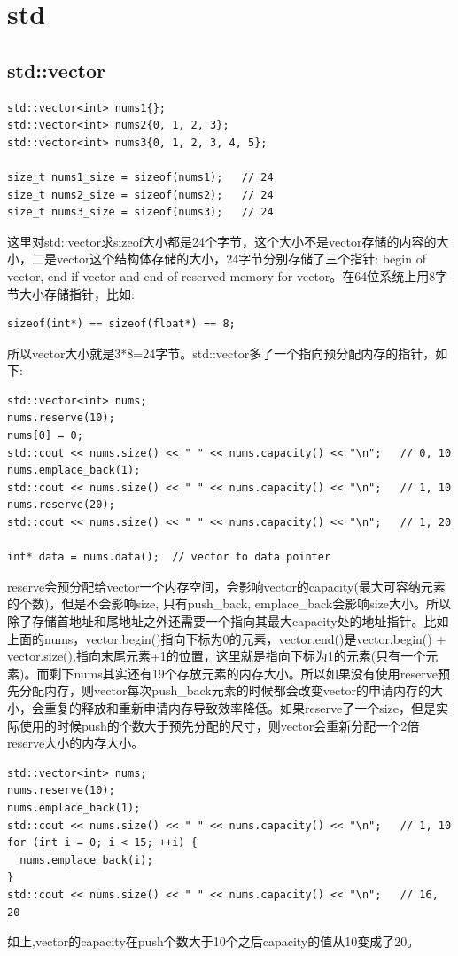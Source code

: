 \documentclass[12pt]{book}
\begin{document}
\section{std}
\subsection{std::vector}
\begin{lstlisting}
std::vector<int> nums1{};
std::vector<int> nums2{0, 1, 2, 3};
std::vector<int> nums3{0, 1, 2, 3, 4, 5};

size_t nums1_size = sizeof(nums1);   // 24
size_t nums2_size = sizeof(nums2);   // 24
size_t nums3_size = sizeof(nums3);   // 24
\end{lstlisting}
这里对std::vector求sizeof大小都是24个字节，这个大小不是vector存储的内容的大小，二是vector这个结构体存储的大小，24字节分别存储了三个指针: begin of vector, end if vector and end of reserved memory for vector。在64位系统上用8字节大小存储指针，比如:
\begin{lstlisting}
sizeof(int*) == sizeof(float*) == 8;
\end{lstlisting}
所以vector大小就是3*8=24字节。std::vector多了一个指向预分配内存的指针，如下:
\begin{lstlisting}
std::vector<int> nums;
nums.reserve(10);
nums[0] = 0;
std::cout << nums.size() << " " << nums.capacity() << "\n";   // 0, 10
nums.emplace_back(1);
std::cout << nums.size() << " " << nums.capacity() << "\n";   // 1, 10
nums.reserve(20);
std::cout << nums.size() << " " << nums.capacity() << "\n";   // 1, 20

int* data = nums.data();  // vector to data pointer
\end{lstlisting}
reserve会预分配给vector一个内存空间，会影响vector的capacity(最大可容纳元素的个数)，但是不会影响size, 只有push\_back, emplace\_back会影响size大小。所以除了存储首地址和尾地址之外还需要一个指向其最大capacity处的地址指针。比如上面的nums，vector.begin()指向下标为0的元素，vector.end()是vector.begin() + vector.size(),指向末尾元素+1的位置，这里就是指向下标为1的元素(只有一个元素)。而剩下nums其实还有19个存放元素的内存大小。所以如果没有使用reserve预先分配内存，则vector每次push\_back元素的时候都会改变vector的申请内存的大小，会重复的释放和重新申请内存导致效率降低。如果reserve了一个size，但是实际使用的时候push的个数大于预先分配的尺寸，则vector会重新分配一个2倍reserve大小的内存大小。
\begin{lstlisting}
std::vector<int> nums;
nums.reserve(10);
nums.emplace_back(1);
std::cout << nums.size() << " " << nums.capacity() << "\n";   // 1, 10
for (int i = 0; i < 15; ++i) {
  nums.emplace_back(i);
}
std::cout << nums.size() << " " << nums.capacity() << "\n";   // 16, 20
\end{lstlisting}
如上,vector的capacity在push个数大于10个之后capacity的值从10变成了20。
\end{document}
